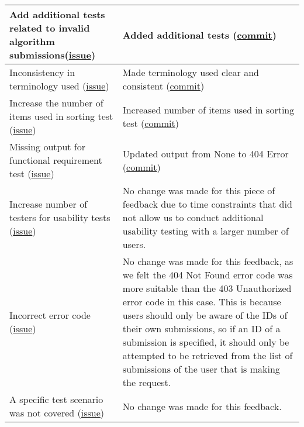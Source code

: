 \documentclass{article}
\begin{document}
\begin{tabularx}{\textwidth}{X|X}
    \midrule
    Add additional tests related to invalid algorithm submissions(\href{https://github.com/AidanMariglia/SOCAlgoTestPlatform/issues/24}{issue}) & Added additional tests (\href{https://github.com/AidanMariglia/SOCAlgoTestPlatform/commit/9100d6316e8fa31be4188f90e8e1f911d284663f}{commit}) \\
    \midrule
    Inconsistency in terminology used (\href{https://github.com/AidanMariglia/SOCAlgoTestPlatform/issues/33}{issue}) & Made terminology used clear and consistent (\href{https://github.com/AidanMariglia/SOCAlgoTestPlatform/commit/34aa07b568b6c7ecb1446de3beaa44f901a2144e}{commit}) \\
    \midrule
    Increase the number of items used in sorting test (\href{https://github.com/AidanMariglia/SOCAlgoTestPlatform/issues/32}{issue}) & Increased number of items used in sorting test (\href{https://github.com/AidanMariglia/SOCAlgoTestPlatform/commit/09e40e4fdbfa9cf003e199378899914342bd1b66}{commit}) \\
    \midrule
    Missing output for functional requirement test (\href{https://github.com/AidanMariglia/SOCAlgoTestPlatform/issues/31}{issue}) & Updated output from None to 404 Error (\href{https://github.com/AidanMariglia/SOCAlgoTestPlatform/commit/4ac6e568f2c49912540f10af98601065b64ce01c#diff-8d3e9ddbf3d26cf5e2a7027bf962071598c6f3916127fdabcb800f03d22ba969R423f}{commit}) \\
    \midrule
    Increase number of testers for usability tests (\href{https://github.com/AidanMariglia/SOCAlgoTestPlatform/issues/143}{issue}) & No change was made for this piece of feedback due to time constraints that did not allow us to conduct additional usability testing with a larger number of users. \\
    \midrule
    Incorrect error code (\href{https://github.com/AidanMariglia/SOCAlgoTestPlatform/issues/146}{issue}) & No change was made for this feedback, as we felt the 404 Not Found error code was more suitable than the 403 Unauthorized error code in this case. This is because users should only be aware of the IDs of their own submissions, so if an ID of a submission is specified, it should only be attempted to be retrieved from the list of submissions of the user that is making the request. \\
    \midrule
    A specific test scenario was not covered (\href{https://github.com/AidanMariglia/SOCAlgoTestPlatform/issues/145}{issue}) & No change was made for this feedback. \\
    
    \bottomrule
\end{tabularx}
\end{document}

